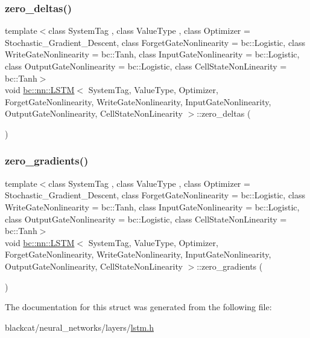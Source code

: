 \mbox{\label{structbc_1_1nn_1_1LSTM_a415bda3dd81d13f4e675ad182ab6bc27}} 
\subsubsection{\texorpdfstring{zero\+\_\+deltas()}{zero\_deltas()}}
{\footnotesize\ttfamily template$<$class System\+Tag , class Value\+Type , class Optimizer  = Stochastic\+\_\+\+Gradient\+\_\+\+Descent, class Forget\+Gate\+Nonlinearity  = bc\+::\+Logistic, class Write\+Gate\+Nonlinearity  = bc\+::\+Tanh, class Input\+Gate\+Nonlinearity  = bc\+::\+Logistic, class Output\+Gate\+Nonlinearity  = bc\+::\+Logistic, class Cell\+State\+Non\+Linearity  = bc\+::\+Tanh$>$ \\
void \hyperlink{structbc_1_1nn_1_1LSTM}{bc\+::nn\+::\+L\+S\+TM}$<$ System\+Tag, Value\+Type, Optimizer, Forget\+Gate\+Nonlinearity, Write\+Gate\+Nonlinearity, Input\+Gate\+Nonlinearity, Output\+Gate\+Nonlinearity, Cell\+State\+Non\+Linearity $>$\+::zero\+\_\+deltas (\begin{DoxyParamCaption}{ }\end{DoxyParamCaption})\hspace{0.3cm}{\ttfamily [inline]}}

\mbox{\label{structbc_1_1nn_1_1LSTM_ae8885e5fe317b5c485f64717e9037bb5}} 
\subsubsection{\texorpdfstring{zero\+\_\+gradients()}{zero\_gradients()}}
{\footnotesize\ttfamily template$<$class System\+Tag , class Value\+Type , class Optimizer  = Stochastic\+\_\+\+Gradient\+\_\+\+Descent, class Forget\+Gate\+Nonlinearity  = bc\+::\+Logistic, class Write\+Gate\+Nonlinearity  = bc\+::\+Tanh, class Input\+Gate\+Nonlinearity  = bc\+::\+Logistic, class Output\+Gate\+Nonlinearity  = bc\+::\+Logistic, class Cell\+State\+Non\+Linearity  = bc\+::\+Tanh$>$ \\
void \hyperlink{structbc_1_1nn_1_1LSTM}{bc\+::nn\+::\+L\+S\+TM}$<$ System\+Tag, Value\+Type, Optimizer, Forget\+Gate\+Nonlinearity, Write\+Gate\+Nonlinearity, Input\+Gate\+Nonlinearity, Output\+Gate\+Nonlinearity, Cell\+State\+Non\+Linearity $>$\+::zero\+\_\+gradients (\begin{DoxyParamCaption}{ }\end{DoxyParamCaption})\hspace{0.3cm}{\ttfamily [inline]}}



The documentation for this struct was generated from the following file\+:\begin{DoxyCompactItemize}
\item 
blackcat/neural\+\_\+networks/layers/\hyperlink{lstm_8h}{lstm.\+h}\end{DoxyCompactItemize}
